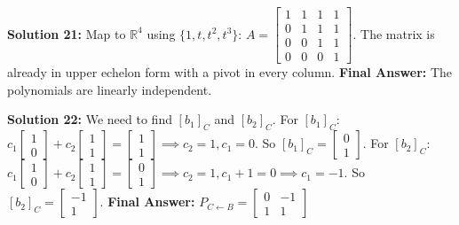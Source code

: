 \documentclass{article}
\begin{document}
\vspace{0.3cm}
\textbf{Solution 21:} Map to $\mathbb{R}^4$ using $\{1, t, t^2, t^3\}$:
$A = \begin{bmatrix} 1 & 1 & 1 & 1 \\ 0 & 1 & 1 & 1 \\ 0 & 0 & 1 & 1 \\ 0 & 0 & 0 & 1 \end{bmatrix}$.
The matrix is already in upper echelon form with a pivot in every column.
\textbf{Final Answer:} The polynomials are linearly independent.

\vspace{0.3cm}
\textbf{Solution 22:} We need to find $[b_1]_C$ and $[b_2]_C$.
For $[b_1]_C$: $c_1 \begin{bmatrix} 1 \\ 0 \end{bmatrix} + c_2 \begin{bmatrix} 1 \\ 1 \end{bmatrix} = \begin{bmatrix} 1 \\ 1 \end{bmatrix} \implies c_2 = 1, c_1 = 0$. So $[b_1]_C = \begin{bmatrix} 0 \\ 1 \end{bmatrix}$.
For $[b_2]_C$: $c_1 \begin{bmatrix} 1 \\ 0 \end{bmatrix} + c_2 \begin{bmatrix} 1 \\ 1 \end{bmatrix} = \begin{bmatrix} 0 \\ 1 \end{bmatrix} \implies c_2 = 1, c_1 + 1 = 0 \implies c_1 = -1$. So $[b_2]_C = \begin{bmatrix} -1 \\ 1 \end{bmatrix}$.
\textbf{Final Answer:} $P_{C \leftarrow B} = \begin{bmatrix} 0 & -1 \\ 1 & 1 \end{bmatrix}$
\end{document}
